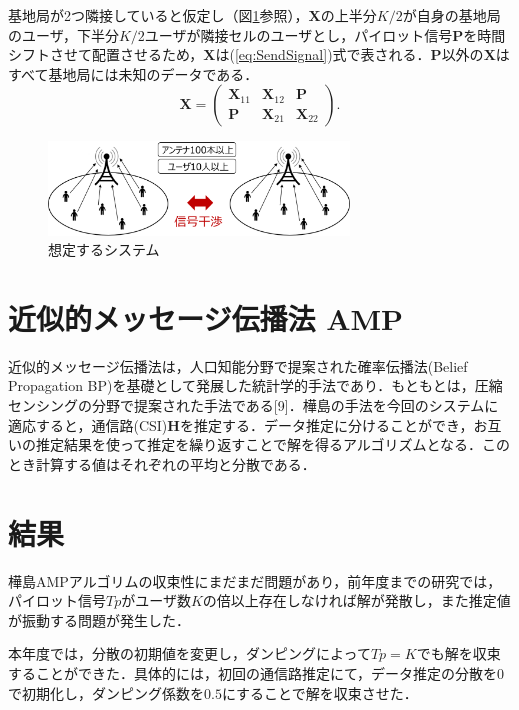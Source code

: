 \documentclass{jarticle}
\begin{document}
基地局が2つ隣接していると仮定し（図\ref{fig:system}参照），$\boldsymbol{X}$の上半分$K/2$が自身の基地局のユーザ，下半分$K/2$ユーザが隣接セルのユーザとし，パイロット信号$\boldsymbol{P}$を時間シフトさせて配置させるため，$\boldsymbol{X}$は(\ref{eq:SendSignal})式で表される．$\boldsymbol{P}$以外の$\boldsymbol{X}$はすべて基地局には未知のデータである．
\begin{equation} 
	\label{eq:SendSignal}
	\boldsymbol{X} =  \left(
		\begin{array}{cccc}
			\boldsymbol{X}_{11} &\boldsymbol{X}_{12} &\boldsymbol{P}\\
			\boldsymbol{P} &\boldsymbol{X}_{21} &\boldsymbol{X}_{22}
		\end{array}
	\right).
\end{equation}
\begin{figure}[htbp]
    \begin{center}
     \includegraphics[width=80mm]{./system.png}
    \end{center}
    \caption{想定するシステム}
    \label{fig:system}
\end{figure}
\section{近似的メッセージ伝播法 AMP}
近似的メッセージ伝播法は，人口知能分野で提案された確率伝播法(Belief Propagation BP)を基礎として発展した統計学的手法であり．もともとは，圧縮センシングの分野で提案された手法である[9]．樺島の手法を今回のシステムに適応すると，通信路(CSI)$\boldsymbol{H}$を推定する．データ推定に分けることができ，お互いの推定結果を使って推定を繰り返すことで解を得るアルゴリズムとなる．このとき計算する値はそれぞれの平均と分散である．
\section{結果}
樺島AMPアルゴリムの収束性にまだまだ問題があり，前年度までの研究では，パイロット信号$Tp$がユーザ数$K$の倍以上存在しなければ解が発散し，また推定値が振動する問題が発生した．

本年度では，分散の初期値を変更し，ダンピング\cite{vila}によって$Tp=K$でも解を収束することができた．具体的には，初回の通信路推定にて，データ推定の分散を0で初期化し，ダンピング係数を$0.5$にすることで解を収束させた．
\end{document}
